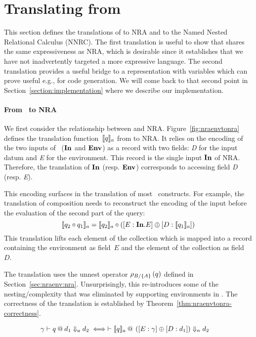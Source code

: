 \section{Translating from \NRAEnv}
\label{sec:export}

This section defines the translations of \NRAEnv to NRA and to the
Named Nested Relational Calculus (NNRC). The first translation is
useful to show that \NRAEnv shares the same expressiveness as NRA,
which is desirable since it establishes that we have not inadvertently
targeted a more expressive language. The second translation provides a
useful bridge to a representation with variables which can prove
useful e.g., for code generation. We will come back to that second
point in Section~\ref{section:implementation} where we describe our
implementation.

\paragraph*{From \NRAEnv\ to NRA}
We first consider the relationship between \NRAEnv and NRA.
%
Figure~\ref{fig:nraenvtonra} defines the translation function~$\etoa{q}$
from \NRAEnv to NRA.
%
It relies on the encoding of the two inputs of \NRAEnv~($\qID$ and
$\qENV$) as a record with two fields: \textit{D} for the input datum
and \textit{E} for the environment. This record is the single input
$\qID$ of NRA. Therefore, the translation of $\qID$ (resp. $\qENV$)
corresponds to accessing field \textit{D} (resp. \textit{E}).

This encoding surfaces in the translation of most \NRAEnv\ constructs.
%
For example, the translation of composition needs to reconstruct
the encoding of the input before the evaluation of the second part of
the query:
$$
\etoa{q_2 \circ q_1} = \etoa{q_2} \circ ([E:\qID.E] \opconcat [D:\etoa{q_1}])
$$
This translation lifts each element of the collection which is mapped
into a record containing the environment as field~$E$ and the element
of the collection as field~$D$.

The translation uses the unnest operator $\quntwo{A}{B}{q}$ defined
in Section~\ref{sec:nraenv:nra}. Unsurprisingly, this re-introduces some
of the nesting/complexity that was eliminated by supporting
environments in \NRAEnv. The correctness of the translation is
established by Theorem~\ref{thm:nraenvtonra-correctness}.

\begin{theorem}
  \label{thm:nraenvtonra-correctness}
{  \small
  \begin{align*}
    \gamma \vdash q \rapp d_1\Downarrowa d_2 & \iff \vdash \etoa{q} \qapp \left([E:\gamma] \opconcat [D:d_1]\right)\Downarrown d_2
  \end{align*}}
\end{theorem}

